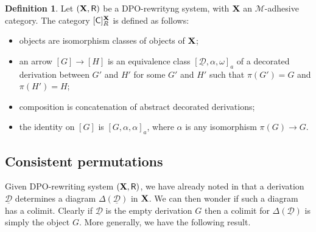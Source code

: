 \documentclass[a4paper]{article}
\def\R{\mathsf{R}}
\def\X{\textbf {\textup{X}}}
\newcommand{\dder}[1]{\mathscr{#1}}
\newcommand{\der}[1]{\underline{\dder{#1}}}
\def\dpi{[\mathsf{C}]^{\X}_R}
\theoremstyle{definition}
\newtheorem{definition}[theorem]{Definition}
\begin{document}
\begin{definition}
	Let $(\X, \R)$ be a DPO-rewrityng system, with $\X$ an $\mathcal{M}$-adhesive category. The  category $\dpi$ is defined as follows:
	\begin{itemize}
		\item objects are isomorphism classes of objects of $\X$;
		\item an arrow $[G]\to [H]$ is an equivalence class $[\der{D}, \alpha, \omega]_a$ of a decorated derivation between $G'$ and $H'$ for some $G'$ and $H'$ such that $\pi(G')=G$ and $\pi(H')=H$;
		\item composition is concatenation of abstract decorated derivations;
		\item the identity on $[G]$ is $[G, \alpha, \alpha]_a$, where $\alpha$ is any isomorphism $\pi(G)\to G$.	\end{itemize}
\end{definition}


\subsection{Consistent permutations}

Given DPO-rewriting system $(\X, \R)$,  we have already noted in  that a derivation $\der{D}$  determines a diagram $\Delta(\der{D})$ in $\X$. We can then wonder if such a diagram has a colimit. Clearly if $\der{D}$ is the empty derivation $G$ then a colimit for $\Delta(\der{D})$ is simply the object $G$. More generally, we have the following result.
\end{document}

